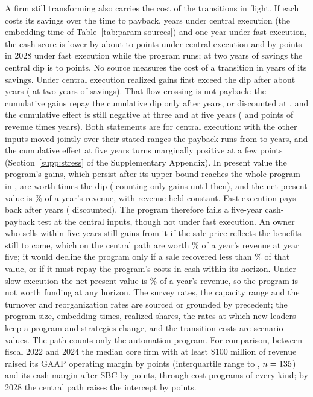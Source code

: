 A firm still transforming also carries the cost of the transitions in flight. If each costs its savings over the time to payback, \PaceTpb{} years under central execution (the embedding time of Table~\ref{tab:param-sources}) and one year under fast execution, the cash score is lower by about \CenDipEight{} to \CenDipSix{} points under central execution and by \PaceDipFast{} points in 2028 under fast execution while the program runs; at two years of savings the central dip is \DipTpbTwoEight{} to \DipTpbTwoSix{} points. No source measures the cost of a transition in years of its savings. Under central execution realized gains first exceed the dip after about \PayCrossCen{} years (\CrossTpbTwo{} at two years of savings). That flow crossing is not payback: the cumulative gains repay the cumulative dip only after \PayBackCen{} years, or \PayBackDiscCen{} discounted at \acqRwAnnual, and the cumulative effect is still negative at three and at five years (\PayHoldThreeCen{} and \PayHoldFiveCen{} points of revenue times years). Both statements are for central execution: with the other inputs moved jointly over their stated ranges the payback runs from \StPayCenMin{} to \StPayCenMax{} years, and the cumulative effect at five years turns marginally positive at a few points (Section~\ref{supp:stress} of the Supplementary Appendix). In present value the program's gains, which persist after its upper bound reaches the whole program in \PayDoneCen, are worth \PayRatioCen{} times the dip (\PayRatioDoneCen{} counting only gains until then), and the net present value is \PayNpvCen\% of a year's revenue, with revenue held constant. Fast execution pays back after \PayBackFast{} years (\PayBackDiscFast{} discounted). The program therefore fails a five-year cash-payback test at the central inputs, though not under fast execution. An owner who sells within five years still gains from it if the sale price reflects the benefits still to come, which on the central path are worth \PayExitFiveCen\% of a year's revenue at year five; it would decline the program only if a sale recovered less than \PayExitBreakCen\% of that value, or if it must repay the program's costs in cash within its horizon. Under slow execution the net present value is \PayNpvSlow\% of a year's revenue, so the program is not worth funding at any horizon. The survey rates, the capacity range and the turnover and reorganization rates are sourced or grounded by precedent; the program size, embedding times, realized shares, the rates at which new leaders keep a program and strategies change, and the transition costs are scenario values. The path counts only the automation program. For comparison, between fiscal 2022 and 2024 the median core firm with at least \$100 million of revenue raised its GAAP operating margin by \RevealedOpMed{} points (interquartile range \RevealedOpLo{} to \RevealedOpHi, $n=135$) and its cash margin after SBC by \RevealedFcfMed{} points, through cost programs of every kind; by 2028 the central path raises the intercept by \CenRiseEight{} points.

